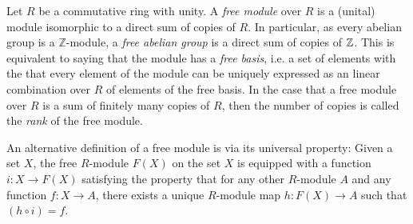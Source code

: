 \documentclass{article}
\begin{document}
Let $R$ be a commutative ring with unity.  A {\it free module} over $R$ 
is a (unital) module isomorphic to a direct sum of copies of $R$.  In particular, as every abelian group is a $\mathbb{Z}$-module, a {\it free abelian group} is a direct sum of copies of $\Bbb{Z}$.  This is equivalent to saying that the module has a {\it free basis},
i.e. a set of elements with the  that every element of the module can be uniquely expressed as an linear combination over $R$
of elements of the free basis.  In the case that a free module over $R$ is a sum of finitely many copies of $R$, then the number of copies is called the {\it rank} of the free module.

An alternative definition of a free module is via its universal property:  Given a set $X$, the free $R$-module $F(X)$ on the set $X$ is equipped with a function $i:X\rightarrow F(X)$ satisfying the property that for any other $R$-module $A$ and any function $f:X\rightarrow A$, there exists a unique $R$-module map $h:F(X)\rightarrow A$ such that $(h\circ i)=f$.
\end{document}

